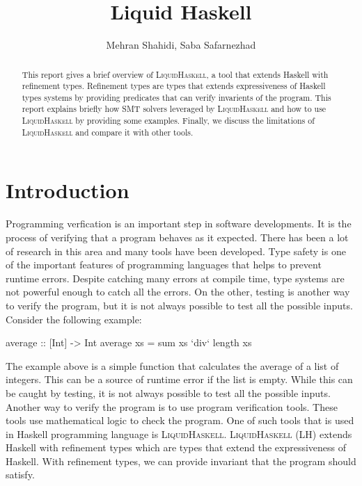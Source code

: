\documentclass[]{rptuseminar}
\title{Liquid Haskell}
\author{Mehran Shahidi, Saba Safarnezhad
  \institute{Rheinland-Pfälzische Technische Universität Kaiserslautern-Landau, Department of Computer Science}}
\begin{document}

\maketitle


\begin{abstract}
  This report gives a brief overview of \textsc{LiquidHaskell}, a tool that extends Haskell with refinement types. 
  Refinement types are types that extends expressiveness of Haskell types systems by providing predicates that can verify
  invarients of the program. This report explains briefly how SMT solvers leveraged by \textsc{LiquidHaskell} and 
  how to use \textsc{LiquidHaskell} by providing some examples. Finally, we discuss the limitations of \textsc{LiquidHaskell} and compare it with other tools.
\end{abstract}


\section{Introduction}
\label{sec:introduction}
Programming verfication is an important step in software developments. It is the process of
verifying that a program behaves as it expected. There has been a lot of research in this 
area and many tools have been developed. 
Type safety is one of the important features of programming languages that helps to prevent runtime errors.
Despite catching many errors at compile time, type systems are not powerful enough to catch all the errors.
On the other, testing is another way to verify the program, but it is not always possible to test all the possible inputs.
Consider the following example:

\begin{haskell}
  average    :: [Int] -> Int
  average xs = sum xs `div` length xs
\end{haskell}

The example above is a simple function that calculates the average of a list of integers. This can be a source of runtime
error if the list is empty. While this can be caught by testing, it is not always possible to test all the possible inputs.
Another way to verify the program is to use program verification tools. These tools use mathematical logic to check the program.
One of such tools that is used in Haskell programming language is \textsc{LiquidHaskell}. \textsc{LiquidHaskell} 
(LH) extends Haskell with refinement types which are types that extend the expressiveness of Haskell.
With refinement types, we can provide invariant that the program should satisfy. 
\end{document}
